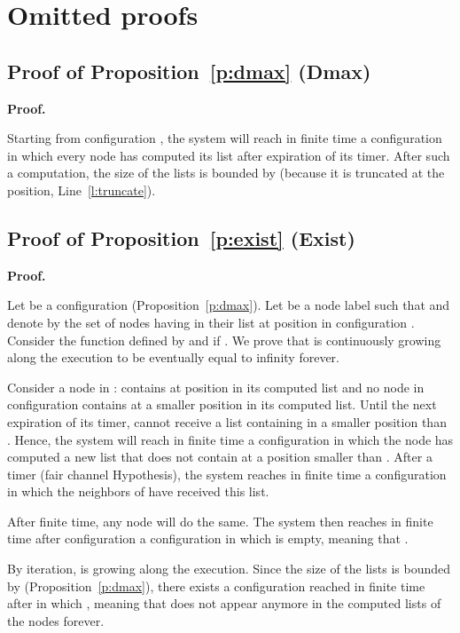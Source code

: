 \documentclass[11pt,english]{article}
\newenvironment{proof}[1][0cm]{
  \begin{list}{\bf Proof.~}{
      \setlength{\itemindent}{0cm}
      \setlength{\labelsep}{0cm}
      \setlength{\labelwidth}{#1}
      \setlength{\leftmargin}{#1}
    \item
    }
}{\hfill
  \end{list}
}
\begin{document}
\label{sec:biblio}

\newpage


\mbox{}
\vspace{1cm}
\appendix


\section{Omitted proofs}

\subsection{Proof of Proposition~\ref{p:dmax} (Dmax)}
\begin{proof}
 Starting from configuration , the system will reach in finite time a
 configuration in which every node has computed its list after expiration of its
 timer. After such a computation, the size of the lists is bounded by
  (because it is truncated at the  position,
 Line~\ref{l:truncate}).
 \end{proof}


\subsection{Proof of  Proposition~\ref{p:exist} (Exist)}

\begin{proof}
Let  be a configuration (Proposition~\ref{p:dmax}).
Let  be a node label such that  and denote by  the set of
nodes having  in their list at position  in configuration .  Consider
the function  defined by  and  if . We prove that  is continuously growing along the execution to
be eventually equal to infinity forever.

Consider a node  in :  contains  at position
 in its computed list and no node in configuration  contains 
at a smaller position in its computed list. Until the next expiration of its
timer,  cannot receive a list containing  in a smaller position than
.
Hence, the system will reach in finite time a configuration in which the node
 has computed a new list that does not contain  at a position smaller than
. After a timer (fair channel Hypothesis), the system reaches in
finite time a configuration in which the neighbors of  have received this
list.

After finite time, any node  will do the same. The system
then reaches in finite time after configuration  a configuration  in
which  is empty, meaning that .

By iteration,  is growing along the execution.  Since the size of the
lists is bounded by  (Proposition~\ref{p:dmax}), there exists a
configuration  reached in finite time after  in which , meaning that  does not appear anymore in the computed lists of the
nodes forever.
\end{proof}
\end{document}
